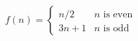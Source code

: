 \documentclass[preview]{standalone}
\begin{document}
\begin{align*}
f(n) = \begin{cases}n/2  & n \text{ is even} \\3n+1 & n \text{ is odd}\end{cases}
\end{align*}
\end{document}
